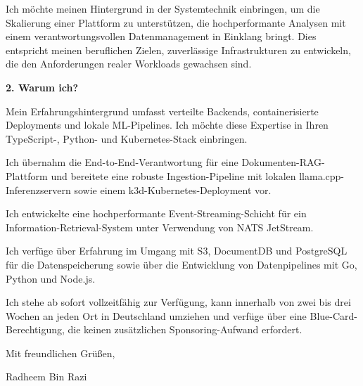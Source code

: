 \documentclass[11pt,a4paper]{coverletter}
\begin{document}
Ich möchte meinen Hintergrund in der Systemtechnik einbringen, um die Skalierung einer Plattform zu unterstützen, die hochperformante Analysen mit einem verantwortungsvollen Datenmanagement in Einklang bringt. Dies entspricht meinen beruflichen Zielen, zuverlässige Infrastrukturen zu entwickeln, die den Anforderungen realer Workloads gewachsen sind.

\vspace{8pt}\noindent\textbf{2. Warum ich?}\par\vspace{3pt}

Mein Erfahrungshintergrund umfasst verteilte Backends, containerisierte Deployments und lokale ML-Pipelines. Ich möchte diese Expertise in Ihren TypeScript-, Python- und Kubernetes-Stack einbringen.

\bullets

  \item Ich übernahm die End-to-End-Verantwortung für eine Dokumenten-RAG-Plattform und bereitete eine robuste Ingestion-Pipeline mit lokalen llama.cpp-Inferenzservern sowie einem k3d-Kubernetes-Deployment vor.

  \item Ich entwickelte eine hochperformante Event-Streaming-Schicht für ein Information-Retrieval-System unter Verwendung von NATS JetStream.

  \item Ich verfüge über Erfahrung im Umgang mit S3, DocumentDB und PostgreSQL für die Datenspeicherung sowie über die Entwicklung von Datenpipelines mit Go, Python und Node.js.

\bulletsend

Ich stehe ab sofort vollzeitfähig zur Verfügung, kann innerhalb von zwei bis drei Wochen an jeden Ort in Deutschland umziehen und verfüge über eine Blue-Card-Berechtigung, die keinen zusätzlichen Sponsoring-Aufwand erfordert.

\closing{Mit freundlichen Grüßen,}{Radheem Bin Razi}
\end{document}

